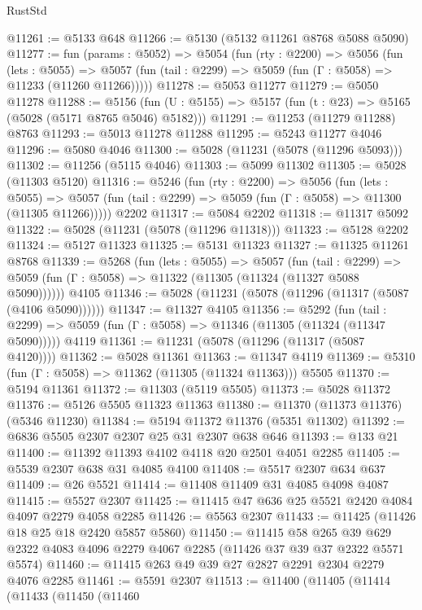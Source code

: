 \begin{lexlean}{RustStd}
\begin{coremodule}
{\begin{coremodule}
{{{{{{{{{{{{@11261 := @5133 @648
@11266 := @5130 (@5132 @11261 @8768 @5088 @5090)
@11277 := fun (params : @5052) =>
  @5054
    (fun (rty : @2200) =>
    @5056
      (fun (lets : @5055) =>
      @5057 (fun (tail : @2299) => @5059 (fun (Γ : @5058) => @11233 (@11260 @11266)))))
@11278 := @5053 @11277
@11279 := @5050 @11278
@11288 := @5156
    (fun (U : @5155) => @5157 (fun (t : @23) => @5165 (@5028 (@5171 @8765 @5046) @5182)))
@11291 := @11253 (@11279 @11288) @8763
@11293 := @5013 @11278 @11288
@11295 := @5243 @11277 @4046
@11296 := @5080 @4046
@11300 := @5028 (@11231 (@5078 (@11296 @5093)))
@11302 := @11256 (@5115 @4046)
@11303 := @5099 @11302
@11305 := @5028 (@11303 @5120)
@11316 := @5246
    (fun (rty : @2200) =>
    @5056
      (fun (lets : @5055) =>
      @5057 (fun (tail : @2299) => @5059 (fun (Γ : @5058) => @11300 (@11305 @11266)))))
    @2202
@11317 := @5084 @2202
@11318 := @11317 @5092
@11322 := @5028 (@11231 (@5078 (@11296 @11318)))
@11323 := @5128 @2202
@11324 := @5127 @11323
@11325 := @5131 @11323
@11327 := @11325 @11261 @8768
@11339 := @5268
    (fun (lets : @5055) =>
    @5057
      (fun (tail : @2299) =>
      @5059 (fun (Γ : @5058) => @11322 (@11305 (@11324 (@11327 @5088 @5090))))))
    @4105
@11346 := @5028 (@11231 (@5078 (@11296 (@11317 (@5087 (@4106 @5090))))))
@11347 := @11327 @4105
@11356 := @5292
    (fun (tail : @2299) => @5059 (fun (Γ : @5058) => @11346 (@11305 (@11324 (@11347 @5090)))))
    @4119
@11361 := @11231 (@5078 (@11296 (@11317 (@5087 @4120))))
@11362 := @5028 @11361
@11363 := @11347 @4119
@11369 := @5310 (fun (Γ : @5058) => @11362 (@11305 (@11324 @11363))) @5505
@11370 := @5194 @11361
@11372 := @11303 (@5119 @5505)
@11373 := @5028 @11372
@11376 := @5126 @5505 @11323 @11363
@11380 := @11370 (@11373 @11376) (@5346 @11230)
@11384 := @5194 @11372 @11376 (@5351 @11302)
@11392 := @6836 @5505 @2307 @2307 @25 @31 @2307 @638 @646
@11393 := @133 @21
@11400 := @11392 @11393 @4102 @4118 @20 @2501 @4051 @2285
@11405 := @5539 @2307 @638 @31 @4085 @4100
@11408 := @5517 @2307 @634 @637
@11409 := @26 @5521
@11414 := @11408 @11409 @31 @4085 @4098 @4087
@11415 := @5527 @2307
@11425 := @11415 @47 @636 @25 @5521 @2420 @4084 @4097 @2279 @4058 @2285
@11426 := @5563 @2307
@11433 := @11425 (@11426 @18 @25 @18 @2420 @5857 @5860)
@11450 := @11415
    @58
    @265
    @39
    @629
    @2322
    @4083
    @4096
    @2279
    @4067
    @2285
    (@11426 @37 @39 @37 @2322 @5571 @5574)
@11460 := @11415 @263 @49 @39 @27 @2827 @2291 @2304 @2279 @4076 @2285
@11461 := @5591 @2307
@11513 := @11400
    (@11405
      (@11414
        (@11433
          (@11450
            (@11460
}}}}}}}}}}}}
\end{coremodule}}
\end{coremodule}
\end{lexlean}
